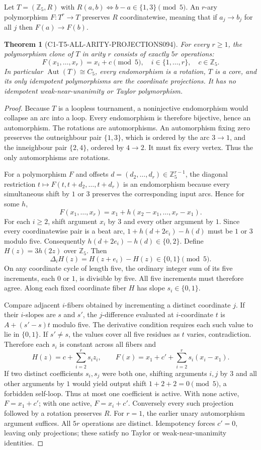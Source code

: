 \documentclass[11pt]{article}
\newtheorem{theorem}{Theorem}
\begin{document}
Let $T=(\mathbb Z_5,R)$ with
$R(a,b)\iff b-a\in\{1,3\}\pmod5$.
An $r$-ary polymorphism $F:T^r\to T$ preserves $R$ coordinatewise,
meaning that if $a_j\to b_j$ for all $j$ then $F(a)\to F(b)$.
\begin{theorem}[C1-T5-ALL-ARITY-PROJECTIONS094]
For every $r\ge1$, the polymorphism clone of $T$ in arity $r$
consists of exactly $5r$ operations:
\[
 \boxed{F(x_1,\ldots,x_r)=x_i+c\pmod5,
 \quad i\in\{1,\ldots,r\},\quad c\in\mathbb Z_5.}
\]
In particular $\operatorname{Aut}(T)\cong C_5$, every endomorphism
is a rotation, $T$ is a core, and its only idempotent
polymorphisms are the coordinate projections. It has no idempotent
weak-near-unanimity or Taylor polymorphism.
\end{theorem}
\begin{proof}
Because $T$ is a loopless tournament, a noninjective endomorphism
would collapse an arc into a loop. Every endomorphism is therefore
bijective, hence an automorphism. The rotations are automorphisms.
An automorphism fixing zero preserves the outneighbour pair
$\{1,3\}$, which is ordered by the arc $3\to1$, and the
inneighbour pair $\{2,4\}$, ordered by $4\to2$. It must fix every
vertex. Thus the only automorphisms are rotations.

For a polymorphism $F$ and offsets
$d=(d_2,\ldots,d_r)\in\mathbb Z_5^{r-1}$, the diagonal restriction
$t\mapsto F(t,t+d_2,\ldots,t+d_r)$ is an endomorphism
because every simultaneous shift by $1$ or $3$ preserves the
corresponding input arcs. Hence for some $h$,
\[
 F(x_1,\ldots,x_r)=x_1+
 h(x_2-x_1,\ldots,x_r-x_1).
\]
For each $i\ge2$, shift argument $x_i$ by $3$ and every other
argument by $1$. Since every coordinatewise pair is a beat
arc, $1+h(d+2e_i)-h(d)$ must be $1$ or $3$ modulo five.
Consequently $h(d+2e_i)-h(d)\in\{0,2\}$.
Define $H(z)=3h(2z)$ over $\mathbb Z_5$. Then
\[
 \Delta_iH(z)=H(z+e_i)-H(z)\in\{0,1\}\pmod5.
\]
On any coordinate cycle of length five, the ordinary integer sum
of its five increments, each $0$ or $1$, is divisible by five.
All five increments must therefore agree. Along each fixed
coordinate fiber $H$ has slope $s_i\in\{0,1\}$.

Compare adjacent $i$-fibers obtained by incrementing a distinct
coordinate $j$. If their $i$-slopes are $s$ and $s'$, the
$j$-difference evaluated at $i$-coordinate $t$ is
$A+(s'-s)t$ modulo five. The derivative condition requires
each such value to lie in $\{0,1\}$. If $s'\ne s$, the values
cover all five residues as $t$ varies, contradiction. Therefore
each $s_i$ is constant across all fibers and
\[
 H(z)=c+\sum_{i=2}^r s_i z_i,\qquad
 F(x)=x_1+c'+\sum_{i=2}^r s_i(x_i-x_1).
\]
If two distinct coefficients $s_i,s_j$ were both one,
shifting arguments $i,j$ by $3$ and all other arguments by
$1$ would yield output shift $1+2+2=0\pmod5$, a
forbidden self-loop. Thus at most one coefficient is active.
With none active, $F=x_1+c'$; with one active,
$F=x_i+c'$. Conversely every such projection followed by
a rotation preserves $R$. For $r=1$, the earlier unary
automorphism argument suffices. All $5r$ operations are distinct.
Idempotency forces $c'=0$, leaving only projections;
these satisfy no Taylor or weak-near-unanimity identities.
\end{proof}
\end{document}
